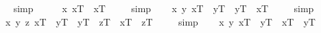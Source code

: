 \begin{isabellebody}
\isadelimproof
\ %
\endisadelimproof
%
\isatagproof
{}\isamarkupfalse%
\ simp\ \isamarkupfalse%
%
\endisatagproof
{\isafoldproof}%
%
\isadelimproof
%
\endisadelimproof
\ \isanewline
\isanewline
\isanewline
\ \isamarkupfalse%
\ {\isachardoublequoteopen}{\isacharbrackleft}{\isacharparenleft}\isactrlbold {\isasymforall}x{\isachardot}\ x\isactrlsup T\ \isactrlbold {\isacharequal}\ x\isactrlsup T{\isacharparenright}{\isacharbrackright}\ {\isacharequal}\ {\isasymtop}{\isachardoublequoteclose}%
\isadelimproof
\ %
\endisadelimproof
%
\isatagproof
{}\isamarkupfalse%
\ simp\ \isamarkupfalse%
%
\endisatagproof
{\isafoldproof}%
%
\isadelimproof
%
\endisadelimproof
\isanewline
\ \isamarkupfalse%
\ {\isachardoublequoteopen}{\isacharbrackleft}{\isacharparenleft}\isactrlbold {\isasymforall}x\ y{\isachardot}\ x\isactrlsup T\ \isactrlbold {\isacharequal}\ y\isactrlsup T\ \isactrlbold {\isasymrightarrow}\ y\isactrlsup T\ \isactrlbold {\isacharequal}\ x\isactrlsup T{\isacharparenright}{\isacharbrackright}\ {\isacharequal}\ {\isasymtop}{\isachardoublequoteclose}%
\isadelimproof
\ %
\endisadelimproof
%
\isatagproof
{}\isamarkupfalse%
\ simp\ \isamarkupfalse%
%
\endisatagproof
{\isafoldproof}%
%
\isadelimproof
%
\endisadelimproof
\isanewline
\ \isamarkupfalse%
\ {\isachardoublequoteopen}{\isacharbrackleft}{\isacharparenleft}\isactrlbold {\isasymforall}x\ y\ z{\isachardot}\ {\isacharparenleft}x\isactrlsup T\ \isactrlbold {\isacharequal}\ y\isactrlsup T\ \isactrlbold {\isasymand}\ y\isactrlsup T\ \isactrlbold {\isacharequal}\ z\isactrlsup T{\isacharparenright}\ \isactrlbold {\isasymrightarrow}\ x\isactrlsup T\ \isactrlbold {\isacharequal}\ z\isactrlsup T{\isacharparenright}{\isacharbrackright}\ {\isacharequal}\ {\isasymtop}{\isachardoublequoteclose}%
\isadelimproof
\ %
\endisadelimproof
%
\isatagproof
{}\isamarkupfalse%
\ simp\ \isamarkupfalse%
%
\endisatagproof
{\isafoldproof}%
%
\isadelimproof
%
\endisadelimproof
\isanewline
\ \isamarkupfalse%
\ {\isachardoublequoteopen}{\isacharbrackleft}{\isacharparenleft}\isactrlbold {\isasymforall}x\ y{\isachardot}\ x\isactrlsup T\ \isactrlbold {\isacharequal}\ y\isactrlsup T\ \isactrlbold {\isasymrightarrow}\ \isactrlbold {\isasymbox}{\isacharparenleft}x\isactrlsup T\ \isactrlbold {\isacharequal}\ y\isactrlsup T{\isacharparenright}{\isacharparenright}{\isacharbrackright}\ {\isacharequal}\ {\isasymtop}{\isachardoublequoteclose}%

\end{isabellebody}
